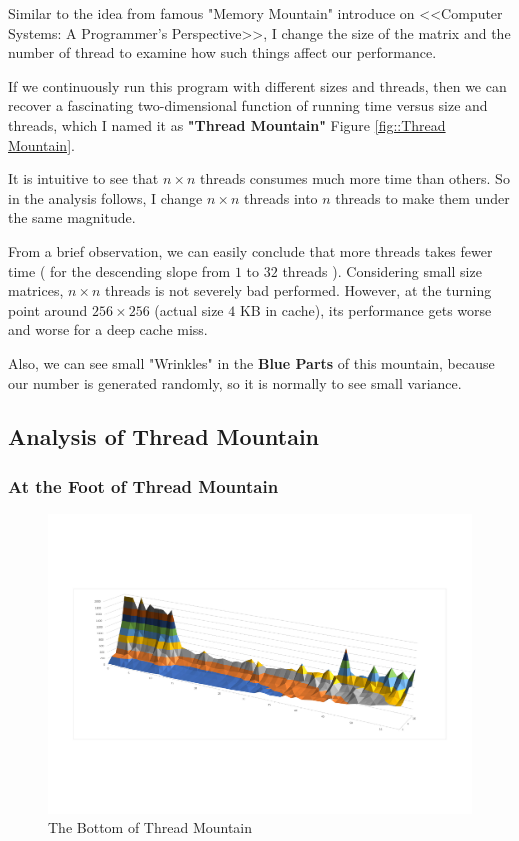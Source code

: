 \documentclass[12pt,a4paper]{article}
\begin{document}
\quad  Similar to the idea from famous "Memory Mountain" introduce on <<Computer Systems: A Programmer's Perspective>>\cite{Bryant2015Computer}, I change the size of the matrix and the number of thread to examine how such things affect our performance.

If we continuously  run this program with different sizes and threads, then we can recover a fascinating two-dimensional function of running time versus size and threads, which I named it as \textbf{"Thread Mountain"} Figure \ref{fig::Thread Mountain}.

It is intuitive to see that $n\times n$ threads consumes much more time than others. So in the analysis follows, I change $n \times n$ threads into $n$ threads to make them under the same magnitude.

From a brief observation, we can easily conclude that more threads takes fewer time ( for the descending slope from $1$ to $32$ threads ). Considering small size matrices, $n\times n $ threads is not severely bad performed. However, at the turning point around $256\times 256$ (actual size $4$ KB in cache), its performance gets worse and worse for a deep cache miss.

Also, we can see small "Wrinkles" in the \textbf{Blue Parts} of this mountain, because our number is generated randomly, so it is normally to see small variance.
\subsection{Analysis of Thread Mountain}
\subsubsection{At the Foot of Thread Mountain}

\begin{figure}[H]
	\centering
	\includegraphics[scale= 0.65]{./fig/1_32_thread_0_50.pdf}
	\caption{The Bottom of Thread Mountain}
	\label{fig::bottom1 of thread mountain}
\end{figure}
\end{document}
